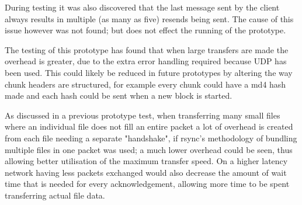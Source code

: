 During testing it was also discovered that the last message sent by the client always results in multiple (as many as five) resends being sent. The cause of this issue however was not found; but does not effect the running of the prototype.

The testing of this prototype has found that when large transfers are made the overhead is greater, due to the extra error handling required because UDP has been used. This could likely be reduced in future prototypes by altering the way chunk headers are structured, for example every chunk could have a md4 hash made and each hash could be sent when a new block is started.

As discussed in a previous prototype test, when transferring many small files where an individual file does not fill an entire packet a lot of overhead is created from each file needing a separate "handshake", if rsync's methodology of bundling multiple files in one packet was used; a much lower overhead could be seen, thus allowing better utilisation of the maximum transfer speed. On a higher latency network having less packets exchanged would also decrease the amount of wait time that is needed for every acknowledgement, allowing more time to be spent transferring actual file data.
